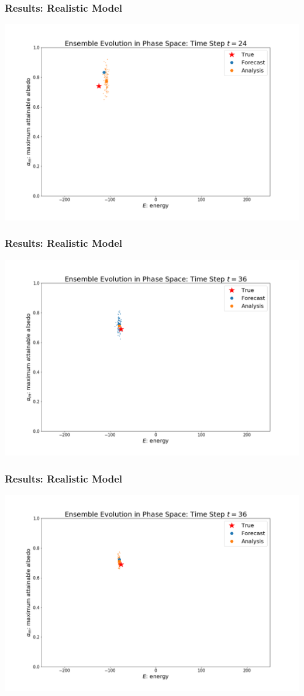 \documentclass{beamer}
\begin{document}
\begin{frame}
\frametitle{Results: Realistic Model}
\centering
\includegraphics[width=\linewidth]{Figures/EnsembleEvolution_analysis_t=24.png}
\end{frame}
\begin{frame}
\frametitle{Results: Realistic Model}
\centering
\includegraphics[width=\linewidth]{Figures/EnsembleEvolution_forecast_t=36.png}
\end{frame}
\begin{frame}
\frametitle{Results: Realistic Model}
\centering
\includegraphics[width=\linewidth]{Figures/EnsembleEvolution_analysis_t=36.png}
\end{frame}
\end{document}
